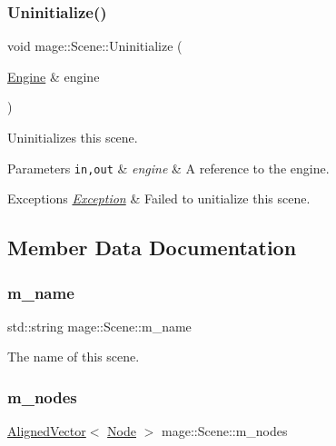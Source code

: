 \subsubsection{\texorpdfstring{Uninitialize()}{Uninitialize()}}
{\footnotesize\ttfamily void mage\+::\+Scene\+::\+Uninitialize (\begin{DoxyParamCaption}\item[{\mbox{\hyperlink{classmage_1_1_engine}{Engine}} \&}]{engine }\end{DoxyParamCaption})}

Uninitializes this scene.


\begin{DoxyParams}[1]{Parameters}
\mbox{\tt in,out}  & {\em engine} & A reference to the engine. \\
\hline
\end{DoxyParams}

\begin{DoxyExceptions}{Exceptions}
{\em \mbox{\hyperlink{classmage_1_1_exception}{Exception}}} & Failed to unitialize this scene. \\
\hline
\end{DoxyExceptions}


\subsection{Member Data Documentation}
\mbox{\label{classmage_1_1_scene_aebd60452eca5423c3bde3fca653f3533}} 
\subsubsection{\texorpdfstring{m\+\_\+name}{m\_name}}
{\footnotesize\ttfamily std\+::string mage\+::\+Scene\+::m\+\_\+name\hspace{0.3cm}{\ttfamily [private]}}

The name of this scene. \mbox{\label{classmage_1_1_scene_a270ac4a26210b95ba05957af19c4c43c}} 
\subsubsection{\texorpdfstring{m\+\_\+nodes}{m\_nodes}}
{\footnotesize\ttfamily \mbox{\hyperlink{namespacemage_a8664bfb5ce2179fc64eae9f82c8a5ba8}{Aligned\+Vector}}$<$ \mbox{\hyperlink{classmage_1_1_node}{Node}} $>$ mage\+::\+Scene\+::m\+\_\+nodes\hspace{0.3cm}{\ttfamily [private]}}

